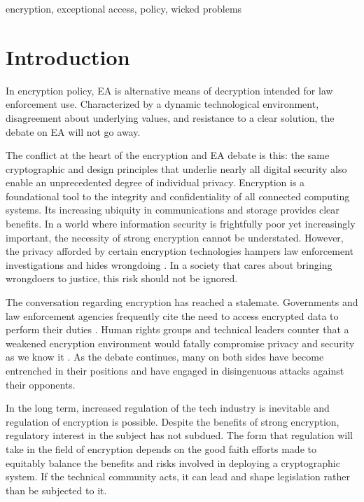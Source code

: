 \documentclass{IEEEtran}
\begin{document}
\begin{IEEEkeywords}
encryption, exceptional access, policy, wicked problems
\end{IEEEkeywords}



\section{Introduction}
\label{sec-intro}


In encryption policy, \ac{EA} is alternative means of
decryption intended for law enforcement use. Characterized by a dynamic technological environment, disagreement about
underlying values, and resistance to a clear solution, the debate on \ac{EA} will not go away. 

The conflict at the heart of the encryption and \ac{EA} debate is this: the same cryptographic and design principles
that underlie nearly all digital security also enable an unprecedented degree of individual privacy. Encryption is a
foundational tool to the integrity and confidentiality of all connected computing systems. Its increasing ubiquity in
communications and storage provides clear benefits. In a world where information security is frightfully poor yet
increasingly important, the necessity of strong encryption cannot be understated. However, the privacy afforded by
certain encryption technologies hampers law enforcement investigations and hides wrongdoing \cite{cox_2020}
\cite{keller_internet_2019}. In a society that cares about bringing wrongdoers to justice, this risk should not be
ignored.

The conversation regarding encryption has reached a stalemate. Governments and law enforcement agencies frequently cite
the need to access encrypted data to perform their duties \cite{ministerial_2018} \cite{intl_2020} \cite{comey_2014}.
Human rights groups and technical leaders counter that a weakened encryption environment would fatally compromise
privacy and security as we know it \cite{abelson_2015} \cite{eightythree_2017} \cite{ruiz_there_2018}. As the debate
continues, many on both sides have become entrenched in their positions and have engaged in disingenuous attacks against
their opponents.

In the long term, increased regulation of the tech industry is inevitable and regulation of encryption is possible.
Despite the benefits of strong encryption, regulatory interest in the subject has not subdued. The form that regulation
will take in the field of encryption depends on the good faith efforts made to equitably balance the benefits and risks
involved in deploying a cryptographic system. If the technical community acts, it can lead and shape legislation rather
than be subjected to it.
\end{document}
